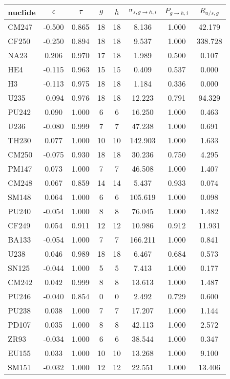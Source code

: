 \begin{tabular}{|l|ccccccc|}
\hline
nuclide & $\epsilon$ & $\tau$ & $g$ & $h$ & $\sigma_{s,g\to h,i}$ & $P_{g\to h,i}$ & $R_{a/s,g}$\\
\hline
CM247 & -0.500 & 0.865 & 18 & 18 & 8.136 & 1.000 & 42.179\\
CF250 & -0.250 & 0.894 & 18 & 18 & 9.537 & 1.000 & 338.728\\
NA23 & 0.206 & 0.970 & 17 & 18 & 1.989 & 0.500 & 0.107\\
HE4 & -0.115 & 0.963 & 15 & 15 & 0.409 & 0.537 & 0.000\\
H3 & -0.113 & 0.975 & 18 & 18 & 1.184 & 0.336 & 0.000\\
U235 & -0.094 & 0.976 & 18 & 18 & 12.223 & 0.791 & 94.329\\
PU242 & 0.090 & 1.000 & 6 & 6 & 16.250 & 1.000 & 0.463\\
U236 & -0.080 & 0.999 & 7 & 7 & 47.238 & 1.000 & 0.691\\
TH230 & 0.077 & 1.000 & 10 & 10 & 142.903 & 1.000 & 1.633\\
CM250 & -0.075 & 0.930 & 18 & 18 & 30.236 & 0.750 & 4.295\\
PM147 & 0.073 & 1.000 & 7 & 7 & 46.508 & 1.000 & 1.407\\
CM248 & 0.067 & 0.859 & 14 & 14 & 5.437 & 0.933 & 0.074\\
SM148 & 0.064 & 1.000 & 6 & 6 & 105.619 & 1.000 & 0.098\\
PU240 & -0.054 & 1.000 & 8 & 8 & 76.045 & 1.000 & 1.482\\
CF249 & 0.054 & 0.911 & 12 & 12 & 10.986 & 0.912 & 11.931\\
BA133 & -0.054 & 1.000 & 7 & 7 & 166.211 & 1.000 & 0.841\\
U238 & 0.046 & 0.989 & 18 & 18 & 6.467 & 0.684 & 0.573\\
SN125 & -0.044 & 1.000 & 5 & 5 & 7.413 & 1.000 & 0.177\\
CM242 & 0.042 & 0.999 & 8 & 8 & 13.613 & 1.000 & 1.487\\
PU246 & -0.040 & 0.854 & 0 & 0 & 2.492 & 0.729 & 0.600\\
PU238 & 0.038 & 1.000 & 7 & 7 & 17.207 & 1.000 & 1.144\\
PD107 & 0.035 & 1.000 & 8 & 8 & 42.113 & 1.000 & 2.572\\
ZR93 & -0.034 & 1.000 & 6 & 6 & 38.544 & 1.000 & 0.347\\
EU155 & 0.033 & 1.000 & 10 & 10 & 13.268 & 1.000 & 9.100\\
SM151 & -0.032 & 1.000 & 12 & 12 & 22.551 & 1.000 & 13.406\\

\end{tabular}
